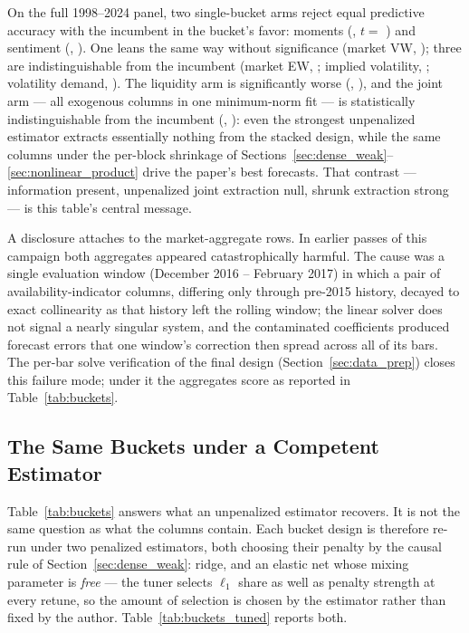 On the full 1998--2024 panel, two single-bucket arms reject equal
predictive accuracy with the incumbent in the bucket's favor: moments
(\unifMomentsDelta{}, $t = $ \unifMomentsDM{}) and sentiment
(\unifSentimentDelta{}, \unifSentimentDM{}). One leans the same way
without significance (market VW, \unifMarketVwDM{}); three are
indistinguishable from the incumbent (market EW, \unifMarketEwDM{};
implied volatility, \unifImpliedVolDM{}; volatility demand,
\unifVolDemandDM{}). The liquidity arm is significantly worse
(\unifLiquidityDelta{}, \unifLiquidityDM{}), and the joint arm --- all
exogenous columns in one minimum-norm fit --- is statistically
indistinguishable from the incumbent (\unifAllFeaturesDelta{},
\unifAllFeaturesDM{}): even the strongest unpenalized estimator extracts
essentially nothing from the stacked design, while the same columns under
the per-block shrinkage of
Sections~\ref{sec:dense_weak}--\ref{sec:nonlinear_product} drive the paper's
best forecasts. That contrast --- information present, unpenalized joint
extraction null, shrunk extraction strong --- is this table's central
message.

A disclosure attaches to the market-aggregate rows. In earlier passes of
this campaign both aggregates appeared catastrophically harmful. The cause
was a single evaluation window (December 2016 -- February 2017) in which a
pair of availability-indicator columns, differing only through pre-2015
history, decayed to exact collinearity as that history left the rolling
window; the linear solver does not signal a nearly singular system, and the
contaminated coefficients produced forecast errors that one window's
correction then spread across all of its bars. The per-bar solve
verification of the final design (Section~\ref{sec:data_prep}) closes this
failure mode; under it the aggregates score as reported in
Table~\ref{tab:buckets}.

\subsection{The Same Buckets under a Competent Estimator}
\label{sec:buckets_tuned}

Table~\ref{tab:buckets} answers what an unpenalized estimator recovers.
It is not the same question as what the columns contain. Each bucket
design is therefore re-run under two penalized estimators, both choosing
their penalty by the causal rule of Section~\ref{sec:dense_weak}: ridge,
and an elastic net whose mixing parameter is \emph{free} --- the tuner
selects $\ell_1$ share as well as penalty strength at every retune, so
the amount of selection is chosen by the estimator rather than fixed by
the author. Table~\ref{tab:buckets_tuned} reports both.

